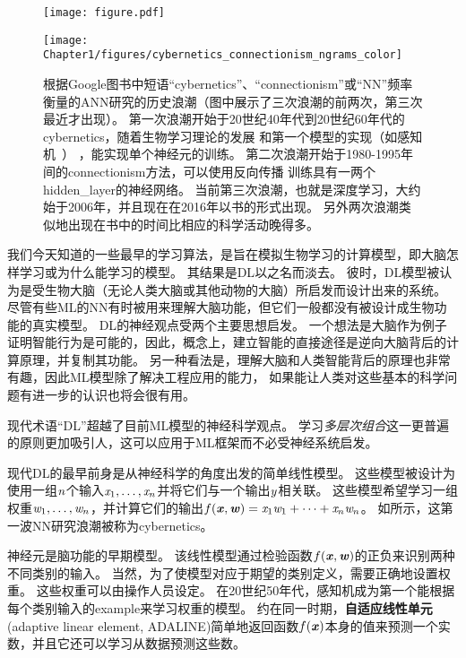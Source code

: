 \begin{figure}[!htb]
\ifOpenSource
\centerline{\texttt{[image: figure.pdf]}}
\else
\centerline{\texttt{[image: Chapter1/figures/cybernetics\_connectionism\_ngrams\_color]}}
\fi
\caption{根据Google图书中短语``\gls{cybernetics}''、``\gls{connectionism}''或``\gls{NN}''频率衡量的\gls{ANN}研究的历史浪潮（图中展示了三次浪潮的前两次，第三次最近才出现）。
第一次浪潮开始于20世纪40年代到20世纪60年代的\gls{cybernetics}，随着生物学习理论的发展\citep{McCulloch43,Hebb49}
和第一个模型的实现（如感知机~\citep{Rosenblatt-1958}） ，能实现单个神经元的训练。
第二次浪潮开始于1980-1995年间的\gls{connectionism}方法，可以使用反向传播\citep{Rumelhart86b-small} 训练具有一两个\gls{hidden_layer}的神经网络。
当前第三次浪潮，也就是深度学习，大约始于2006年\citep{Hinton06,Bengio-nips-2006-small,ranzato-07-small}，并且现在在2016年以书的形式出现。
另外两次浪潮类似地出现在书中的时间比相应的科学活动晚得多。
}
\label{fig:chap1_cybernetics_connectionism_ngrams_color}
\end{figure}


我们今天知道的一些最早的学习算法，是旨在模拟生物学习的计算模型，即大脑怎样学习或为什么能学习的模型。
其结果是\gls{DL}以之名而淡去。
彼时，\gls{DL}模型被认为是受生物大脑（无论人类大脑或其他动物的大脑）所启发而设计出来的系统。
尽管有些\gls{ML}的\gls{NN}有时被用来理解大脑功能\citep{hinton1991lesioning}，但它们一般都没有被设计成生物功能的真实模型。
\gls{DL}的神经观点受两个主要思想启发。
一个想法是大脑作为例子证明智能行为是可能的，因此，概念上，建立智能的直接途径是逆向大脑背后的计算原理，并复制其功能。
另一种看法是，理解大脑和人类智能背后的原理也非常有趣，因此\gls{ML}模型除了解决工程应用的能力， 如果能让人类对这些基本的科学问题有进一步的认识也将会很有用。

  
现代术语``\gls{DL}''超越了目前\gls{ML}模型的神经科学观点。
学习\emph{多层次组合}这一更普遍的原则更加吸引人，这可以应用于\gls{ML}框架而不必受神经系统启发。
 
 
现代\gls{DL}的最早前身是从神经科学的角度出发的简单线性模型。
这些模型被设计为使用一组$\mathit{n}$个输入$\mathit{x}_1, \dots ,\mathit{x}_n$并将它们与一个输出$\mathit{y}$相关联。 
这些模型希望学习一组权重$\mathit{w}_1, \dots, \mathit{w}_n $，并计算它们的输出$f(\boldsymbol{\mathit{x}}, \boldsymbol{\mathit{w}}) = \mathit{x}_1 \mathit{w}_1 + \dots + \mathit{x}_n \mathit{w}_n$。
如所示，这第一波\gls{NN}研究浪潮被称为\gls{cybernetics}。

神经元\citep{McCulloch43}是脑功能的早期模型。
该线性模型通过检验函数$f(\boldsymbol{\mathit{x}},\boldsymbol{\mathit{w}})$的正负来识别两种不同类别的输入。
当然，为了使模型对应于期望的类别定义，需要正确地设置权重。
这些权重可以由操作人员设定。
在20世纪50年代，感知机\citep{Rosenblatt-1956,Rosenblatt-1958}成为第一个能根据每个类别输入的\gls{example}来学习权重的模型。
约在同一时期，\textbf{自适应线性单元}(adaptive linear element, ADALINE)简单地返回函数$f(\boldsymbol{\mathit{x}})$本身的值来预测一个实数\citep{Widrow60}，并且它还可以学习从数据预测这些数。


